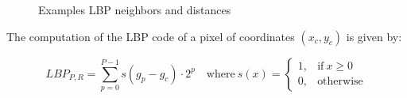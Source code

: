 \begin{figure}[!htb]
  \centering
    \hspace{1mm}
    \hspace{1mm}
    \caption{Examples LBP neighbors and distances}
    \label{ch2:fig4}
\end{figure}

The computation of the \Gls{LBP} code of a pixel of coordinates $(x_c,y_c)$ is given by:

\begin{equation}
 LBP_{P,R} = \sum_{p=0}^{P-1} s(g_p - g_c) \cdot 2^{p} \quad \textrm{where} \ s(x) = 
    \left\{
	\begin{array}{ll} 1, & \textrm{if} \ x \geq 0\\
			  0, & \textrm{otherwise}
	\end{array}
    \right.
\end{equation}

